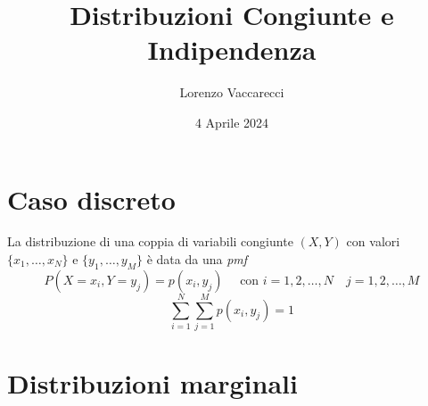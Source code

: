 \documentclass[12pt]{article}
\title{Distribuzioni Congiunte e Indipendenza}
\author{Lorenzo Vaccarecci}
\date{4 Aprile 2024}
\begin{document}
\maketitle
\section{Caso discreto}
La distribuzione di una coppia di variabili congiunte $(X,Y)$ con valori $\{x_{1},\ldots,x_{N}\}$ e $\{y_{1},\ldots,y_{M}\}$ è data da una \textit{pmf}
\begin{equation*}
    P(X= x_{i}, Y = y_{j}) = p(x_{i},y_{j}) \quad \text{ con } i = 1,2,\ldots,N \quad j = 1,2,\ldots,M
\end{equation*}
\begin{equation*}
    \sum_{i=1}^{N} \sum_{j=1}^{M} p(x_{i},y_{j}) = 1
\end{equation*}
\section{Distribuzioni marginali}
\end{document}
